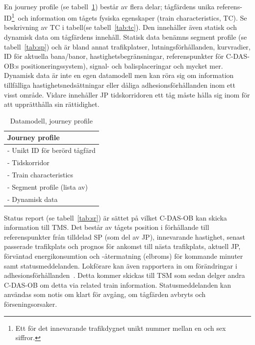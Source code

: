 \paragraph{}
\hspace{-11pt}En journey profile (se tabell~\ref{tab:jp}) består av flera delar; tågfärdens unika referens-ID\footnote{Ett för det innevarande trafikdygnet unikt nummer mellan en och sex siffror.}~och information om tågets fysiska egenskaper (train characteristics, TC).
Se beskrivning av TC i tabell(se tabell~\ref{tab:tc}).
Den innehåller även statisk och dynamisk data om tågfärdens innehåll.
Statisk data benämns segment profile (se tabell~\ref{tab:sp}) och är bland annat trafikplatser, lutningsförhållanden, kurvradier, ID för aktuella bana/banor, hastighetsbegränsningar, referenspunkter för C-DAS-OB:s positioneringssystem), signal- och balisplaceringar och mycket mer.
Dynamisk data är inte en egen datamodell men kan röra sig om information tillfälliga hastighetsnedsättningar eller dåliga adhesionsförhållanden inom ett visst område.
Vidare innehåller JP tidskorridoren ett tåg måste hålla sig inom för att upprätthålla sin rättidighet.
\begin{table}[hbt!]
    \centering
    \begin{tabular}{|l|}
        \hline
        \textbf{Journey profile} \\
        \hline
        - Unikt ID för berörd tågfärd \\
        - Tidskorridor \\
        - Train characteristics \\
        - Segment profile (lista av) \\
        - Dynamisk data \\
        \hline
    \end{tabular}
    \caption{Datamodell, journey profile}
    \label{tab:jp}
\end{table}
Status report (se tabell~\ref{tab:sr}) är sättet på vilket C-DAS-OB kan skicka information till TMS\cite{IRS90940}.
Det består av tågets position i förhållande till referenspunkter från tilldelad SP (som del av JP), innevarande hastighet, senast passerade trafikplats och prognos för ankomst till nästa trafikplats, aktuell JP, förväntad energikonsumtion och -återmatning (elbroms) för kommande minuter samt statusmeddelanden\cite{IRS90940}.
Lokförare kan även rapportera in om förändringar i adhesionsförhållanden~\cite{IRS90940}.
Detta kommer skickas till TSM som sedan delger andra C-DAS-OB om detta via related train information.
Statusmeddelanden kan användas som notis om klart för avgång, om tågfärden avbryts och förseningsorsaker.
